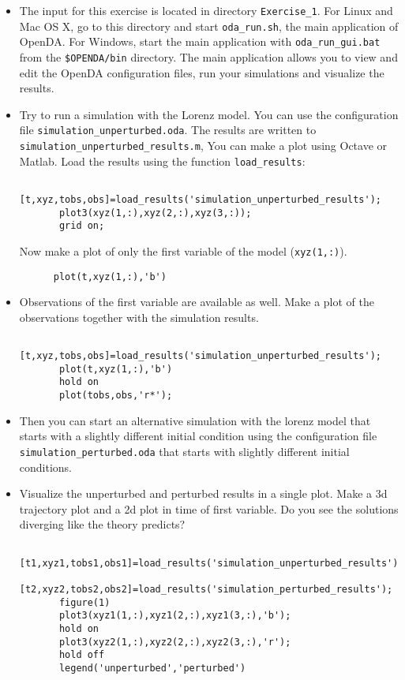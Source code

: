 \documentclass[a4paper,10pt]{article}
\begin{document}
\begin{itemize}
\item The input for this exercise is located in directory {\tt Exercise\_1}.
      For Linux and Mac OS X, go to this directory and start {\tt oda\_run.sh}, the
      main application of OpenDA. For Windows, start the main application with 
      {\tt oda\_run\_gui.bat} from the {\tt \$OPENDA/bin} directory. The main 
      application allows you to view and edit the OpenDA configuration files, run your
      simulations and visualize the results.
\item Try to run a simulation with the Lorenz model. You can use the
      configuration file {\tt simulation\_unperturbed.oda}. The results are
      written to {\tt simulation\_unperturbed\_results.m}, You can make a
      plot using Octave or Matlab. Load the results using the function
      {\tt load\_results}:
{\footnotesize
\begin{verbatim}
       [t,xyz,tobs,obs]=load_results('simulation_unperturbed_results');
       plot3(xyz(1,:),xyz(2,:),xyz(3,:));
       grid on;
\end{verbatim}
}
       Now make a plot of only the first variable of the model ({\tt xyz(1,:)}).
{\footnotesize
\begin{verbatim}
      plot(t,xyz(1,:),'b')
\end{verbatim}
}
%

\item Observations of the first variable are available as well. Make a plot of
      the observations together with the simulation results.
{\footnotesize
\begin{verbatim}
       [t,xyz,tobs,obs]=load_results('simulation_unperturbed_results');
       plot(t,xyz(1,:),'b')
       hold on
       plot(tobs,obs,'r*');
\end{verbatim}
}
\item Then you can start an alternative simulation with the lorenz model that
       starts with a slightly different initial condition using the
       configuration file {\tt simulation\_perturbed.oda} that starts with
       slightly different initial conditions.

\item  Visualize the unperturbed and perturbed results in a single plot. Make
       a 3d trajectory plot and a 2d plot in time of first variable. Do you see
       the solutions diverging like the theory predicts?
{\footnotesize
\begin{verbatim}
       [t1,xyz1,tobs1,obs1]=load_results('simulation_unperturbed_results');
       [t2,xyz2,tobs2,obs2]=load_results('simulation_perturbed_results');
       figure(1)
       plot3(xyz1(1,:),xyz1(2,:),xyz1(3,:),'b');
       hold on
       plot3(xyz2(1,:),xyz2(2,:),xyz2(3,:),'r');
       hold off
       legend('unperturbed','perturbed')


\end{verbatim}}
\end{itemize}
\end{document}
